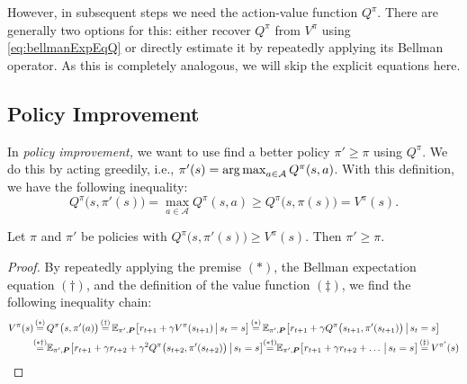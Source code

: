 			However, in subsequent steps we need the action-value function \(Q^\pi\). There are generally two options for this: either recover \(Q^\pi\) from \(V^\pi\) using \eqref{eq:bellmanExpEqQ} or directly estimate it by repeatedly applying its Bellman operator. As this is completely analogous, we will skip the explicit equations here.

		\subsection{Policy Improvement}
			In \emph{policy improvement,} we want to use find a better policy \(\pi' \geq \pi\) using \(Q^\pi\). We do this by acting greedily, i.e., \( \pi'(s) = \operatorname*{arg\,max}_{a \in \mathcal{A}} Q^\pi(s, a) \). With this definition, we have the following inequality:
			\begin{equation}
				Q^\pi\bigl( s, \pi'(s) \bigr)
					= \max_{a \in \mathcal{A}} Q^\pi(s, a)
					\geq Q^\pi\bigl( s, \pi(s) \bigr)
					= V^\pi(s).
			\end{equation}
			\begin{theorem}  \label{th:policyImprovement}
				Let \(\pi\) and \(\pi'\) be policies with \( Q^\pi\bigl( s, \pi'(s) \bigr) \geq V^\pi(s) \). Then \( \pi' \geq \pi \).
			\end{theorem}
			\begin{proof}
				By repeatedly applying the premise \((\ast)\), the Bellman expectation equation \((\dagger)\), and the definition of the value function \((\ddagger)\), we find the following inequality chain:
				\begin{align}
					V^\pi(s)
						&\overset{\mathclap{(\ast)}}{=} Q^\pi\bigl( s, \pi'(a) \bigr)
						 \overset{\mathclap{(\dagger)}}{=} \E_{\pi', \mat{P}}\bigl[ r_{t + 1} + \gamma V^\pi(s_{t + 1}) \biggiven s_t = s \bigr]
						 \overset{\mathclap{(\ast)}}{=} \E_{\pi', \mat{P}}\bigl[ r_{t + 1} + \gamma Q^\pi\bigl( s_{t + 1}, \pi'(s_{t + 1}) \bigr) \biggiven s_t = s \bigr] \\
						&\overset{\mathclap{(\ast\dagger)}}{=} \E_{\pi', \mat{P}}\bigl[ r_{t + 1} + \gamma r_{t + 2} + \gamma^2 Q^\pi\bigl( s_{t + 2}, \pi'(s_{t + 2}) \bigr) \biggiven s_t = s \bigr]
						 \overset{\mathclap{(\ast\dagger)}}{=} \E_{\pi', \mat{P}}\bigl[ r_{t + 1} + \gamma r_{t + 2} + \dots \biggiven s_t = s \bigr]
						 \overset{\mathclap{(\ddagger)}}{=} V^{\pi'}(s)
				\end{align}
			\end{proof}

